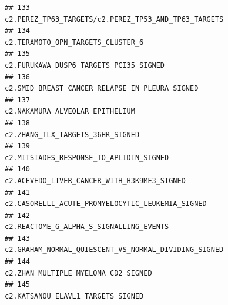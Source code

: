 \documentclass{article}\usepackage[]{graphicx}\usepackage[]{color}
\makeatletter
\newenvironment{kframe}{%
 \def\at@end@of@kframe{}%
 \ifinner\ifhmode%
  \def\at@end@of@kframe{\end{minipage}}%
  \begin{minipage}{\columnwidth}%
 \fi\fi%
 \def\FrameCommand##1{\hskip\@totalleftmargin \hskip-\fboxsep
 \colorbox{shadecolor}{##1}\hskip-\fboxsep
     \hskip-\linewidth \hskip-\@totalleftmargin \hskip\columnwidth}%
 \MakeFramed {\advance\hsize-\width
   \@totalleftmargin\z@ \linewidth\hsize
   \@setminipage}}%
 {\par\unskip\endMakeFramed%
 \at@end@of@kframe}
\newenvironment{knitrout}{}{} %
\makeatother
\begin{document}
\begin{knitrout}
\begin{kframe}
\begin{verbatim}
## 133                                                                                                                                                             c2.PEREZ_TP63_TARGETS/c2.PEREZ_TP53_AND_TP63_TARGETS
## 134                                                                                                                                                                                c2.TERAMOTO_OPN_TARGETS_CLUSTER_6
## 135                                                                                                                                                                           c2.FURUKAWA_DUSP6_TARGETS_PCI35_SIGNED
## 136                                                                                                                                                                   c2.SMID_BREAST_CANCER_RELAPSE_IN_PLEURA_SIGNED
## 137                                                                                                                                                                                  c2.NAKAMURA_ALVEOLAR_EPITHELIUM
## 138                                                                                                                                                                                 c2.ZHANG_TLX_TARGETS_36HR_SIGNED
## 139                                                                                                                                                                          c2.MITSIADES_RESPONSE_TO_APLIDIN_SIGNED
## 140                                                                                                                                                                      c2.ACEVEDO_LIVER_CANCER_WITH_H3K9ME3_SIGNED
## 141                                                                                                                                                                 c2.CASORELLI_ACUTE_PROMYELOCYTIC_LEUKEMIA_SIGNED
## 142                                                                                                                                                                          c2.REACTOME_G_ALPHA_S_SIGNALLING_EVENTS
## 143                                                                                                                                                             c2.GRAHAM_NORMAL_QUIESCENT_VS_NORMAL_DIVIDING_SIGNED
## 144                                                                                                                                                                              c2.ZHAN_MULTIPLE_MYELOMA_CD2_SIGNED
## 145                                                                                                                                                                                c2.KATSANOU_ELAVL1_TARGETS_SIGNED

\end{verbatim}
\end{kframe}
\end{knitrout}
\end{document}

